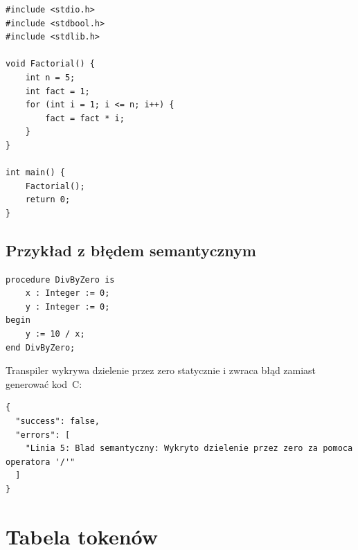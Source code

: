 \documentclass[12pt,a4paper]{article}
\begin{document}
\begin{lstlisting}[style=c, caption={out/factorial.c}]
#include <stdio.h>
#include <stdbool.h>
#include <stdlib.h>

void Factorial() {
    int n = 5;
    int fact = 1;
    for (int i = 1; i <= n; i++) {
        fact = fact * i;
    }
}

int main() {
    Factorial();
    return 0;
}
\end{lstlisting}

\subsection{Przykład z błędem semantycznym}

\begin{lstlisting}[style=ada, caption={Kod Ada z błędem -- dzielenie przez zero}]
procedure DivByZero is
    x : Integer := 0;
    y : Integer := 0;
begin
    y := 10 / x;
end DivByZero;
\end{lstlisting}

Transpiler wykrywa dzielenie przez zero statycznie i zwraca błąd zamiast generować kod~C:

\begin{lstlisting}[style=bnf, caption={Odpowiedź JSON przy błędzie semantycznym}]
{
  "success": false,
  "errors": [
    "Linia 5: Blad semantyczny: Wykryto dzielenie przez zero za pomoca operatora '/'"
  ]
}
\end{lstlisting}

\section{Tabela tokenów}
\end{document}
